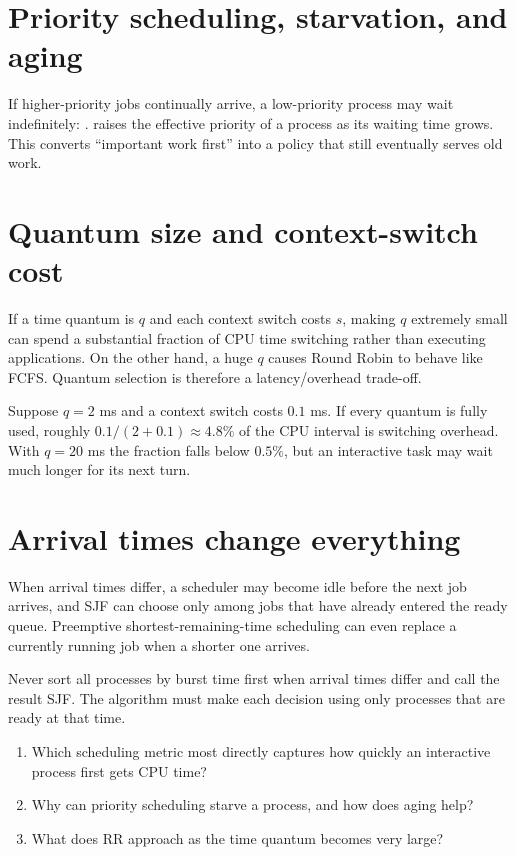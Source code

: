 \section{Priority scheduling, starvation, and aging}
If higher-priority jobs continually arrive, a low-priority process may wait indefinitely: .  raises the effective priority of a process as its waiting time grows. This converts ``important work first'' into a policy that still eventually serves old work.

\section{Quantum size and context-switch cost}
If a time quantum is $q$ and each context switch costs $s$, making $q$ extremely small can spend a substantial fraction of CPU time switching rather than executing applications. On the other hand, a huge $q$ causes Round Robin to behave like FCFS. Quantum selection is therefore a latency/overhead trade-off.

\begin{workedexample}
Suppose $q=2$ ms and a context switch costs $0.1$ ms. If every quantum is fully used, roughly $0.1/(2+0.1)\approx4.8\%$ of the CPU interval is switching overhead. With $q=20$ ms the fraction falls below $0.5\%$, but an interactive task may wait much longer for its next turn.
\end{workedexample}

\section{Arrival times change everything}
When arrival times differ, a scheduler may become idle before the next job arrives, and SJF can choose only among jobs that have already entered the ready queue. Preemptive shortest-remaining-time scheduling can even replace a currently running job when a shorter one arrives.

\begin{pitfall}
Never sort all processes by burst time first when arrival times differ and call the result SJF. The algorithm must make each decision using only processes that are ready at that time.
\end{pitfall}

\begin{quickcheck}
\begin{enumerate}
  \item Which scheduling metric most directly captures how quickly an interactive process first gets CPU time?
  \item Why can priority scheduling starve a process, and how does aging help?
  \item What does RR approach as the time quantum becomes very large?
\end{enumerate}
\end{quickcheck}
